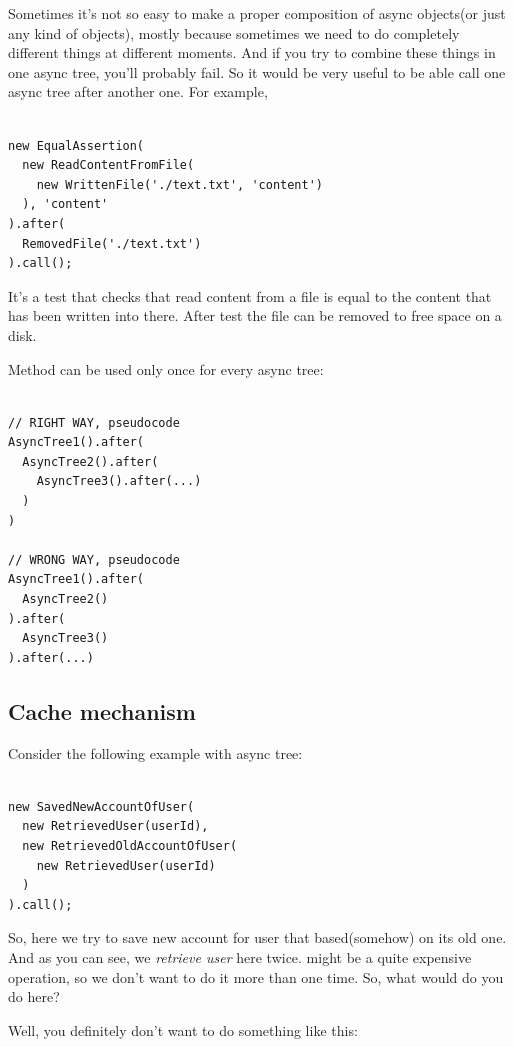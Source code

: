 \documentclass{article}
\newcommand{\cit}[1]{{\fontfamily{qcr}\selectfont{\textcolor{superdarkgray}{#1}}}}
\begin{document}
Sometimes it's not so easy to make a proper composition of async objects(or just any kind of objects), mostly because sometimes we need to do completely different things at different moments. And if you try to combine these things in one async tree, you'll probably fail. So it would be very useful to be able call one async tree after another one. For example,

\begin{lstlisting}

new EqualAssertion(
  new ReadContentFromFile(
    new WrittenFile('./text.txt', 'content')
  ), 'content'
).after(
  RemovedFile('./text.txt')
).call();

\end{lstlisting}

It's a test that checks that read content from a file is equal to the content that has been written into there. After test the file can be removed to free space on a disk.

Method \cit{after} can be used only once for every async tree:

\begin{lstlisting}

// RIGHT WAY, pseudocode
AsyncTree1().after(
  AsyncTree2().after(
    AsyncTree3().after(...)
  )
)

// WRONG WAY, pseudocode
AsyncTree1().after(
  AsyncTree2()
).after(
  AsyncTree3()
).after(...)

\end{lstlisting}

\subsection{Cache mechanism}

Consider the following example with async tree:

\begin{lstlisting}

new SavedNewAccountOfUser(
  new RetrievedUser(userId),
  new RetrievedOldAccountOfUser(
    new RetrievedUser(userId)
  )
).call();

\end{lstlisting}

So, here we try to save new account for user that based(somehow) on its old one. And as you can see, we \textit{retrieve user} here twice. \cit{RetrievedUser} might be a quite expensive operation, so we don't want to do it more than one time. So, what would do you do here?

Well, you definitely don't want to do something like this:
\end{document}
